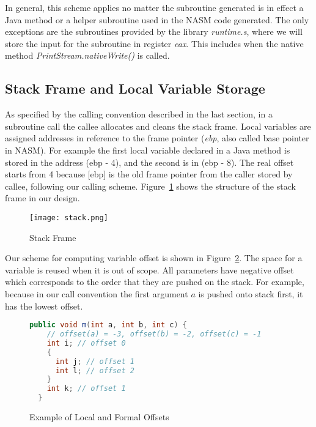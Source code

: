 \documentclass[a4paper, notitlepage]{report}
\begin{document}
In general, this scheme applies no matter the subroutine generated is in effect a Java method or a helper subroutine used in the NASM code generated. The only exceptions are the subroutines provided by the library \emph{runtime.s}, where we will store the input for the subroutine in register \emph{eax}. This includes when the native method \emph{PrintStream.nativeWrite()} is called.


\subsection{Stack Frame and Local Variable Storage}


As specified by the calling convention described in the last section, in a subroutine call the callee allocates and cleans the stack frame. Local variables are assigned addresses in reference to the frame pointer (\emph{ebp}, also called base pointer in NASM). For example the first local variable declared in a Java method is stored in the address (ebp - 4), and the second is in (ebp - 8). The real offset starts from 4 because [ebp] is the old frame pointer from the caller stored by callee, following our calling scheme. Figure~\ref{stack_frame} shows the structure of the stack frame in our design.

\begin{figure}
\centering
\texttt{[image: stack.png]}
  \caption{Stack Frame}
  \label{stack_frame}
\end{figure}

Our scheme for computing variable offset is shown in Figure~\ref{local_offset}. The space for a variable is reused when it is out of scope. All parameters have negative offset which corresponds to the order that they are pushed on the stack. For example, because in our call convention the first argument $a$ is pushed onto stack first, it has the lowest offset.

\begin{figure}
  \centering
\begin{lstlisting}[language=Java, frame=single]
  public void m(int a, int b, int c) {
    // offset(a) = -3, offset(b) = -2, offset(c) = -1
    int i; // offset 0
    {
      int j; // offset 1
      int l; // offset 2
    }
    int k; // offset 1
  }
\end{lstlisting}
\caption{Example of Local and Formal Offsets}
\label{local_offset}
\end{figure}



\end{document}
